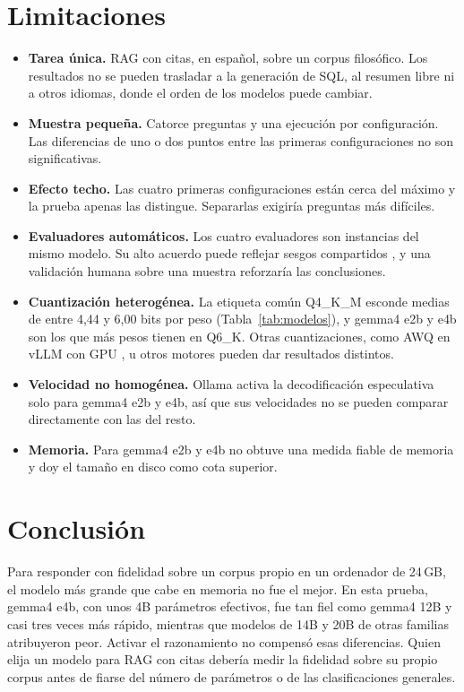 \documentclass{article}
\begin{document}
\section{Limitaciones}

\begin{itemize}\setlength{\itemsep}{1pt}\setlength{\parskip}{0pt}
  \item \textbf{Tarea única.} RAG con citas, en español, sobre un corpus
  filosófico. Los resultados no se pueden trasladar a la generación de SQL,
  al resumen libre ni a otros idiomas, donde el orden de los modelos puede
  cambiar.
  \item \textbf{Muestra pequeña.} Catorce preguntas y una ejecución por
  configuración. Las diferencias de uno o dos puntos entre las primeras
  configuraciones no son significativas.
  \item \textbf{Efecto techo.} Las cuatro primeras configuraciones están
  cerca del máximo y la prueba apenas las distingue. Separarlas exigiría
  preguntas más difíciles.
  \item \textbf{Evaluadores automáticos.} Los cuatro evaluadores son
  instancias del mismo modelo. Su alto acuerdo puede reflejar sesgos
  compartidos \citep{zheng2023judge}, y una validación humana sobre una
  muestra reforzaría las conclusiones.
  \item \textbf{Cuantización heterogénea.} La etiqueta común Q4\_K\_M
  esconde medias de entre 4,44 y 6,00 bits por peso
  (Tabla~\ref{tab:modelos}), y gemma4 e2b y e4b son los que más pesos tienen
  en Q6\_K. Otras cuantizaciones, como AWQ en vLLM con GPU
  \citep{lin2024awq}, u otros motores pueden dar resultados distintos.
  \item \textbf{Velocidad no homogénea.} Ollama activa la decodificación
  especulativa solo para gemma4 e2b y e4b, así que sus velocidades no se
  pueden comparar directamente con las del resto.
  \item \textbf{Memoria.} Para gemma4 e2b y e4b no obtuve una medida fiable
  de memoria y doy el tamaño en disco como cota superior.
\end{itemize}

\section{Conclusión}

Para responder con fidelidad sobre un corpus propio en un ordenador de
24\,GB, el modelo más grande que cabe en memoria no fue el mejor. En esta
prueba, gemma4 e4b, con unos 4B parámetros efectivos, fue tan fiel como
gemma4 12B y casi tres veces más rápido, mientras que modelos de 14B y 20B
de otras familias atribuyeron peor. Activar el razonamiento no compensó esas
diferencias. Quien elija un modelo para RAG con citas debería medir la
fidelidad sobre su propio corpus antes de fiarse del número de parámetros o
de las clasificaciones generales.
\end{document}
